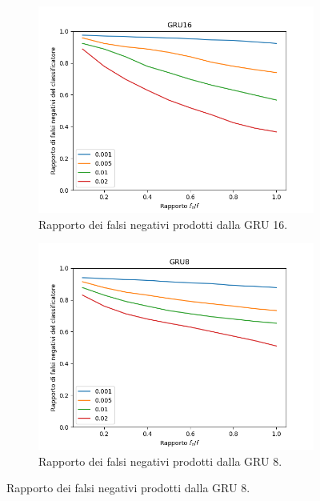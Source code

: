 \documentclass[../../main.tex]{subfiles}
\begin{document}
    \begin{figure}[H]
        \centering
        \begin{subfigure}[b]{0.32\textwidth}
            \centering
            \includegraphics[width = \textwidth]{immagini/7/LBF/GRU16_FNR.png}
            \caption{Rapporto dei falsi negativi prodotti dalla GRU 16.}
            \label{fig:LBFFNR_GRU16}
        \end{subfigure}
        \begin{subfigure}[b]{0.32\textwidth}
            \centering
            \includegraphics[width = \textwidth]{immagini/7/LBF/GRU8_FNR.png}
            \caption{Rapporto dei falsi negativi prodotti dalla GRU 8.}
            \label{fig:LBFFNR_GRU8}

\end{subfigure}
\end{figure}
\end{document}
